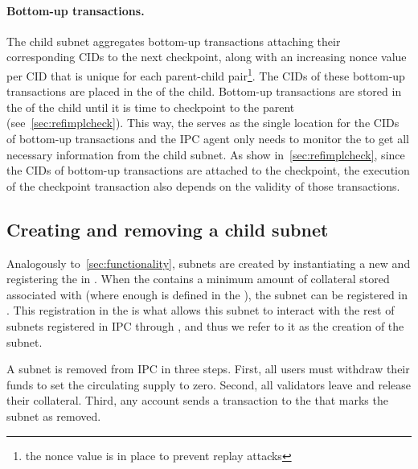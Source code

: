 \paragraph{Bottom-up transactions.}  
The child subnet aggregates bottom-up transactions attaching their corresponding CIDs to the next checkpoint, along with an increasing nonce value per CID that is unique for each parent-child pair\footnote{the nonce value is in place to prevent replay attacks}. The CIDs of these bottom-up transactions are placed in the \gw of the child. Bottom-up transactions are stored in the \gw of the child until it is time to checkpoint to the parent (see~\cref{sec:refimplcheck}). This way, the \gw serves as the single location for the CIDs of bottom-up transactions and the IPC agent only needs to monitor the \gw to get all necessary information from the child subnet. As show in~\cref{sec:refimplcheck}, since the CIDs of bottom-up transactions are attached to the checkpoint, the execution of the checkpoint transaction also depends on the validity of those transactions. 


\subsection{Creating and removing a child subnet} Analogously to~\cref{sec:functionality}, subnets are created by instantiating a new \sa and registering the \sa in \gw. When the \gw contains a minimum amount of collateral stored associated with \sa (where enough is defined in the \gw), the subnet can be registered in \gw. This registration in the \gw is what allows this subnet to interact with the rest of subnets registered in IPC through \gw, and thus we refer to it as the creation of the subnet. 

A subnet is removed from IPC in three steps. First, all users must withdraw their funds to set the circulating supply to zero. Second, all validators leave and release their collateral. Third, any account sends a  transaction to the \gw that marks the subnet as removed.

